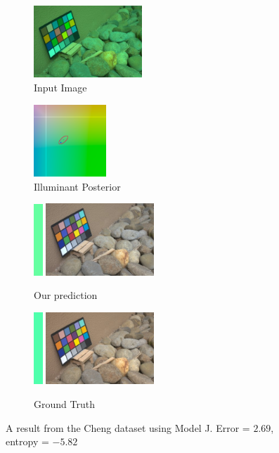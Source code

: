\documentclass[10pt,twocolumn,letterpaper]{article}
\begin{document}
\begin{figure}[!]
\centering
  \begin{subfigure}[!]{1.7in}
    \includegraphics[width=1.6in]{figures/results/cheng/00000233_input.jpg}
    \caption{\footnotesize Input Image}
  \end{subfigure}
  \begin{subfigure}[!]{1.17in}
    \includegraphics[width=1.07in]{figures/results/cheng/00000233_chroma.png}
    \caption{\footnotesize Illuminant Posterior}
  \end{subfigure}
\begin{subfigure}[!]{1.9in}
    \includegraphics[width=0.133in]{figures/results/cheng/00000233_illum.png}\!
    \includegraphics[width=1.6in]{figures/results/cheng/00000233_prediction.jpg}
    \caption{\footnotesize Our prediction}
  \end{subfigure}
  \begin{subfigure}[!]{1.9in}
    \includegraphics[width=0.133in]{figures/results/cheng/00000233_illum_true.png}\!
    \includegraphics[width=1.6in]{figures/results/cheng/00000233_true.jpg}
    \caption{\footnotesize Ground Truth}
  \end{subfigure}
  \caption{
    A result from the Cheng dataset using Model J. Error = $2.69$\textdegree, entropy = $-5.82$
    \label{fig:results14}
  }
\end{figure}
\end{document}
